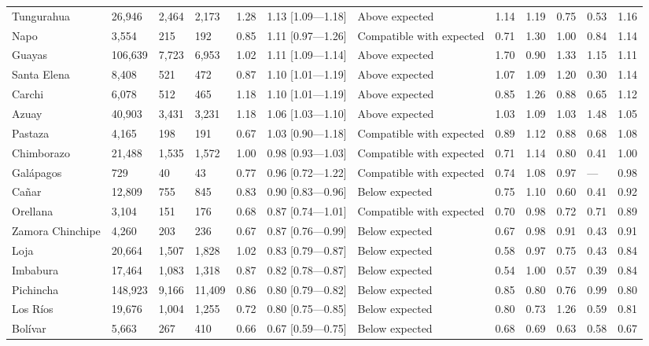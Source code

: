 \documentclass[11pt,a4paper]{article}
\begin{document}
\begin{landscape}
\begin{longtable}{@{}L{32.98mm}L{17.67mm}L{12.96mm}L{15.31mm}L{14.14mm}L{35.34mm}L{24.74mm}L{16.49mm}L{16.49mm}L{16.49mm}L{16.49mm}L{16.49mm}@{}}
Tungurahua & 26,946 & 2,464 & 2,173 & 1.28 & 1.13 [1.09—1.18] & Above expected & 1.14 & 1.19 & 0.75 & 0.53 & 1.16 \\
Napo & 3,554 & 215 & 192 & 0.85 & 1.11 [0.97—1.26] & Compatible with expected & 0.71 & 1.30 & 1.00 & 0.84 & 1.14 \\
Guayas & 106,639 & 7,723 & 6,953 & 1.02 & 1.11 [1.09—1.14] & Above expected & 1.70 & 0.90 & 1.33 & 1.15 & 1.11 \\
Santa Elena & 8,408 & 521 & 472 & 0.87 & 1.10 [1.01—1.19] & Above expected & 1.07 & 1.09 & 1.20 & 0.30 & 1.14 \\
Carchi & 6,078 & 512 & 465 & 1.18 & 1.10 [1.01—1.19] & Above expected & 0.85 & 1.26 & 0.88 & 0.65 & 1.12 \\
Azuay & 40,903 & 3,431 & 3,231 & 1.18 & 1.06 [1.03—1.10] & Above expected & 1.03 & 1.09 & 1.03 & 1.48 & 1.05 \\
Pastaza & 4,165 & 198 & 191 & 0.67 & 1.03 [0.90—1.18] & Compatible with expected & 0.89 & 1.12 & 0.88 & 0.68 & 1.08 \\
Chimborazo & 21,488 & 1,535 & 1,572 & 1.00 & 0.98 [0.93—1.03] & Compatible with expected & 0.71 & 1.14 & 0.80 & 0.41 & 1.00 \\
Galápagos & 729 & 40 & 43 & 0.77 & 0.96 [0.72—1.22] & Compatible with expected & 0.74 & 1.08 & 0.97 & — & 0.98 \\
Cañar & 12,809 & 755 & 845 & 0.83 & 0.90 [0.83—0.96] & Below expected & 0.75 & 1.10 & 0.60 & 0.41 & 0.92 \\
Orellana & 3,104 & 151 & 176 & 0.68 & 0.87 [0.74—1.01] & Compatible with expected & 0.70 & 0.98 & 0.72 & 0.71 & 0.89 \\
Zamora Chinchipe & 4,260 & 203 & 236 & 0.67 & 0.87 [0.76—0.99] & Below expected & 0.67 & 0.98 & 0.91 & 0.43 & 0.91 \\
Loja & 20,664 & 1,507 & 1,828 & 1.02 & 0.83 [0.79—0.87] & Below expected & 0.58 & 0.97 & 0.75 & 0.43 & 0.84 \\
Imbabura & 17,464 & 1,083 & 1,318 & 0.87 & 0.82 [0.78—0.87] & Below expected & 0.54 & 1.00 & 0.57 & 0.39 & 0.84 \\
Pichincha & 148,923 & 9,166 & 11,409 & 0.86 & 0.80 [0.79—0.82] & Below expected & 0.85 & 0.80 & 0.76 & 0.99 & 0.80 \\
Los Ríos & 19,676 & 1,004 & 1,255 & 0.72 & 0.80 [0.75—0.85] & Below expected & 0.80 & 0.73 & 1.26 & 0.59 & 0.81 \\
Bolívar & 5,663 & 267 & 410 & 0.66 & 0.67 [0.59—0.75] & Below expected & 0.68 & 0.69 & 0.63 & 0.58 & 0.67 \\

\end{longtable}
\end{landscape}
\end{document}
